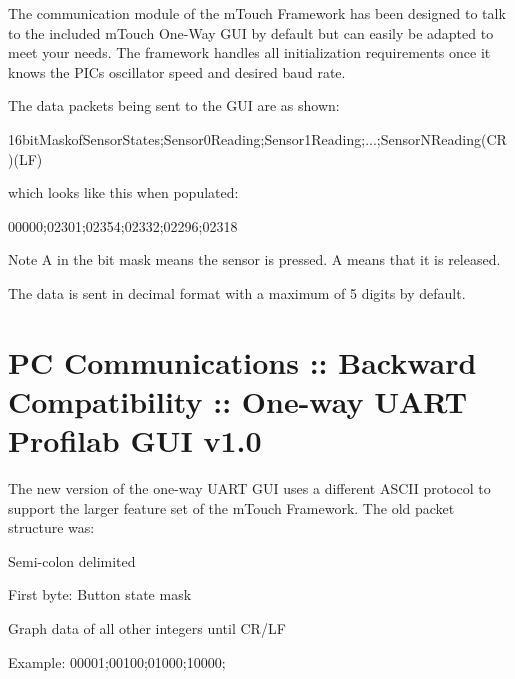 The communication module of the m\+Touch Framework has been designed to talk to the included m\+Touch One-\/\+Way G\+U\+I by default but can easily be adapted to meet your needs. The framework handles all initialization requirements once it knows the P\+I\+C\textquotesingle{}s oscillator speed and desired baud rate.

The data packets being sent to the G\+U\+I are as shown\+: 
\begin{DoxyCode}
16bitMaskofSensorStates;Sensor0Reading;Sensor1Reading;...;SensorNReading(CR)(LF)
\end{DoxyCode}
 which looks like this when populated\+: 
\begin{DoxyCode}
00000;02301;02354;02332;02296;02318
\end{DoxyCode}
 \begin{DoxyNote}{Note}
A {} in the bit mask means the sensor is pressed. A {} means that it is released.
\end{DoxyNote}
The data is sent in decimal format with a maximum of 5 digits by default. \hypertarget{BCPGUI}{}\section{P\+C Communications \+:\+: Backward Compatibility \+:\+: One-\/way U\+A\+R\+T Profilab G\+U\+I v1.0}\label{BCPGUI}
The new version of the one-\/way U\+A\+R\+T G\+U\+I uses a different A\+S\+C\+I\+I protocol to support the larger feature set of the m\+Touch Framework. The old packet structure was\+: \begin{DoxyItemize}
\item Semi-\/colon delimited \item First byte\+: Button state mask \item Graph data of all other integers until C\+R/\+L\+F 
\begin{DoxyCode}
Example: 00001;00100;01000;10000;
\end{DoxyCode}
\end{DoxyItemize}

